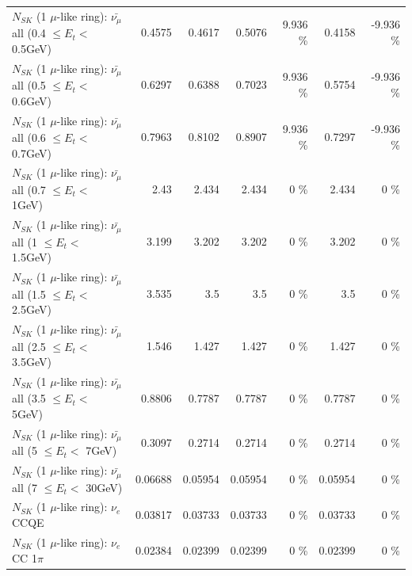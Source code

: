 \begin{table}
\begin{tabular}{| l | r | r | r  r | r  r |}
 $N_{SK}$ (1 $\mu$-like ring): $\bar{\nu_{\mu}}$ all (0.4 $\leq E_{t} <$ 0.5GeV) &          0.4575 &          0.4617 &          0.5076 &    9.936 \%  &          0.4158 &   -9.936 \%  \\ 
 $N_{SK}$ (1 $\mu$-like ring): $\bar{\nu_{\mu}}$ all (0.5 $\leq E_{t} <$ 0.6GeV) &          0.6297 &          0.6388 &          0.7023 &    9.936 \%  &          0.5754 &   -9.936 \%  \\ 
 $N_{SK}$ (1 $\mu$-like ring): $\bar{\nu_{\mu}}$ all (0.6 $\leq E_{t} <$ 0.7GeV) &          0.7963 &          0.8102 &          0.8907 &    9.936 \%  &          0.7297 &   -9.936 \%  \\ 
   $N_{SK}$ (1 $\mu$-like ring): $\bar{\nu_{\mu}}$ all (0.7 $\leq E_{t} <$ 1GeV) &            2.43 &           2.434 &           2.434 &        0 \%  &           2.434 &        0 \%  \\ 
   $N_{SK}$ (1 $\mu$-like ring): $\bar{\nu_{\mu}}$ all (1 $\leq E_{t} <$ 1.5GeV) &           3.199 &           3.202 &           3.202 &        0 \%  &           3.202 &        0 \%  \\ 
 $N_{SK}$ (1 $\mu$-like ring): $\bar{\nu_{\mu}}$ all (1.5 $\leq E_{t} <$ 2.5GeV) &           3.535 &             3.5 &             3.5 &        0 \%  &             3.5 &        0 \%  \\ 
 $N_{SK}$ (1 $\mu$-like ring): $\bar{\nu_{\mu}}$ all (2.5 $\leq E_{t} <$ 3.5GeV) &           1.546 &           1.427 &           1.427 &        0 \%  &           1.427 &        0 \%  \\ 
   $N_{SK}$ (1 $\mu$-like ring): $\bar{\nu_{\mu}}$ all (3.5 $\leq E_{t} <$ 5GeV) &          0.8806 &          0.7787 &          0.7787 &        0 \%  &          0.7787 &        0 \%  \\ 
     $N_{SK}$ (1 $\mu$-like ring): $\bar{\nu_{\mu}}$ all (5 $\leq E_{t} <$ 7GeV) &          0.3097 &          0.2714 &          0.2714 &        0 \%  &          0.2714 &        0 \%  \\ 
    $N_{SK}$ (1 $\mu$-like ring): $\bar{\nu_{\mu}}$ all (7 $\leq E_{t} <$ 30GeV) &         0.06688 &         0.05954 &         0.05954 &        0 \%  &         0.05954 &        0 \%  \\ 
\hline
\hline
\hline
                                      $N_{SK}$ (1 $\mu$-like ring): $\nu_e$ CCQE &         0.03817 &         0.03733 &         0.03733 &        0 \%  &         0.03733 &        0 \%  \\ 
                                 $N_{SK}$ (1 $\mu$-like ring): $\nu_e$ CC 1$\pi$ &         0.02384 &         0.02399 &         0.02399 &        0 \%  &         0.02399 &        0 \%  \\ 

\end{tabular}
\end{table}
